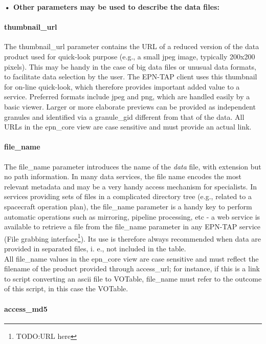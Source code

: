 \documentclass[11pt,a4paper]{ivoa}
\begin{document}
\textbf{• Other parameters may be used to describe the data files:}

\paragraph{thumbnail\_url}

The thumbnail\_url parameter contains the URL of a reduced version of the data product used for quick-look purpose (e.g., a small jpeg image, typically 200x200 pixels). This may be handy in the case of big data files or unusual data formats, to facilitate data selection by the user. The EPN-TAP client uses this thumbnail for on-line quick-look, which therefore provides important added value to a service. Preferred formats include jpeg and png, which are handled easily by a basic viewer. Larger or more elaborate previews can be provided as independent granules and identified via a granule\_gid different from that of the data. All URLs in the epn\_core view are case sensitive and must provide an actual link.

\paragraph{file\_name}

The file\_name parameter introduces the name of the \emph{data} file, with extension but no path information. In many data services, the file name encodes the most relevant metadata and may be a very handy access mechanism for specialists. In services providing sets of files in a complicated directory tree (e.g., related to a spacecraft operation plan), the file\_name parameter is a handy key to perform automatic operations such as mirroring, pipeline processing, etc - a web service is available to retrieve a file from the file\_name parameter in any EPN-TAP service (File grabbing interface\footnote{TODO:URL here}). Its use is therefore always recommended when data are provided in separated files, i. e., not included in the table.\\All file\_name values in the epn\_core view are case sensitive and must reflect the filename of the product provided through access\_url; for instance, if this is a link to script converting an ascii file to VOTable, file\_name must refer to the outcome of this script, in this case the VOTable.

\paragraph{access\_md5}
\end{document}
